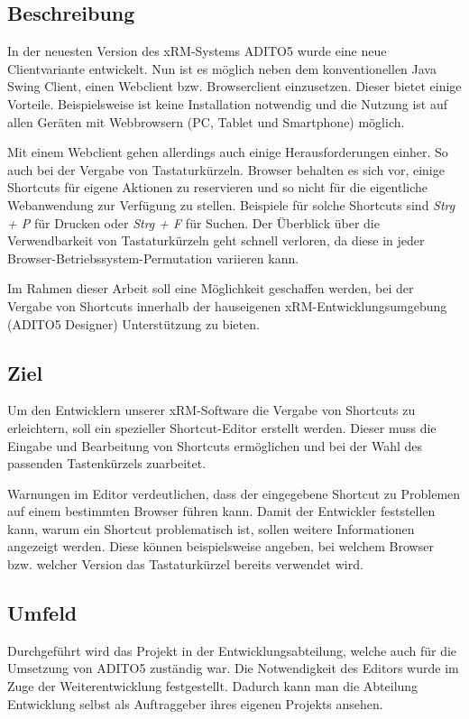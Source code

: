 \subsection{Beschreibung}
 
In der neuesten Version des xRM-Systems ADITO5 wurde eine neue Clientvariante entwickelt. Nun ist es möglich neben dem konventionellen Java Swing Client, einen Webclient bzw. Browserclient einzusetzen. Dieser bietet einige Vorteile. Beispielsweise ist keine Installation notwendig und die Nutzung ist auf allen Geräten mit Webbrowsern (PC, Tablet und Smartphone) möglich. 

Mit einem Webclient gehen allerdings auch einige Herausforderungen einher. So auch bei der Vergabe von Tastaturkürzeln. Browser behalten es sich vor, einige Shortcuts für eigene Aktionen zu reservieren und so nicht für die eigentliche Webanwendung zur Verfügung zu stellen. Beispiele für solche Shortcuts sind \emph{Strg + P} für Drucken oder \emph{Strg + F} für Suchen. Der Überblick über die Verwendbarkeit von Tastaturkürzeln geht schnell verloren, da diese in jeder Browser-Betriebssystem-Permutation variieren kann.

Im Rahmen dieser Arbeit soll eine Möglichkeit geschaffen werden, bei der Vergabe von Shortcuts innerhalb der hauseigenen xRM-Entwicklungsumgebung (ADITO5 Designer) Unterstützung zu bieten.

\subsection{Ziel}

Um den Entwicklern unserer xRM-Software die Vergabe von Shortcuts zu erleichtern, soll ein spezieller Shortcut-Editor erstellt werden. Dieser muss die Eingabe und Bearbeitung von Shortcuts ermöglichen und bei der Wahl des passenden Tastenkürzels zuarbeitet.

Warnungen im Editor verdeutlichen, dass der eingegebene Shortcut zu Problemen auf einem bestimmten Browser führen kann. Damit der Entwickler feststellen kann, warum ein Shortcut problematisch ist, sollen weitere Informationen angezeigt werden. Diese können beispielsweise angeben, bei welchem Browser bzw. welcher Version das Tastaturkürzel bereits verwendet wird.

\subsection{Umfeld}

Durchgeführt wird das Projekt in der Entwicklungsabteilung, welche auch für die Umsetzung von ADITO5 zuständig war. Die Notwendigkeit des Editors wurde im Zuge der Weiterentwicklung festgestellt. Dadurch kann man die Abteilung Entwicklung selbst als Auftraggeber ihres eigenen Projekts ansehen.

